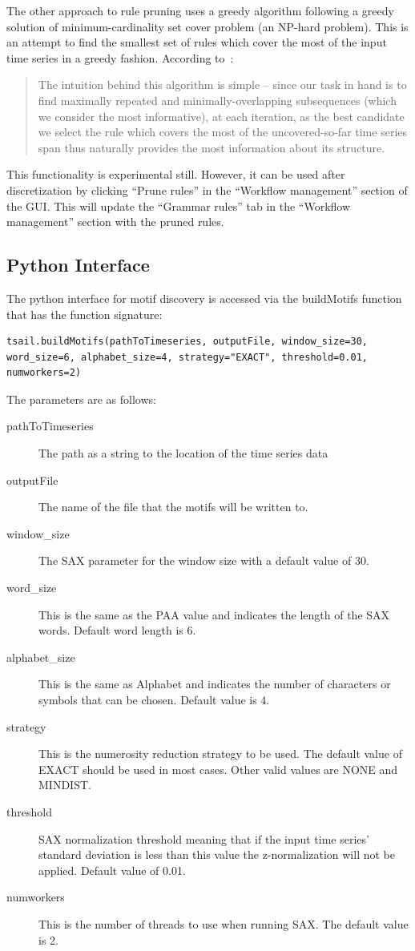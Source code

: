 \documentclass[titlepage, letterpaper, 12pt]{article}
\begin{document}
The other approach to rule pruning uses a greedy algorithm following a greedy solution of minimum-cardinality set cover problem (an NP-hard problem).  This is an attempt to find the smallest set of rules which cover the most of the input time series in a greedy fashion.  According to~\cite{pruneSite}:
\begin{quote}
	The intuition behind this algorithm is simple -- since our task in hand is to find maximally repeated and minimally-overlapping subsequences (which we consider the most informative), at each iteration, as the best candidate we select the rule which covers the most of the uncovered-so-far time series span thus naturally provides the most information about its structure.
\end{quote}

This functionality is experimental still.  However, it can be used after discretization by clicking ``Prune rules'' in the ``Workflow management'' section of the GUI.  This will update the ``Grammar rules'' tab in the ``Workflow management'' section with the pruned rules.




\subsection{Python Interface}
\label{pythonMotif}
The python interface for motif discovery is accessed via the buildMotifs function that has the function signature:
\begin{lstlisting}
tsail.buildMotifs(pathToTimeseries, outputFile, window_size=30, word_size=6, alphabet_size=4, strategy="EXACT", threshold=0.01, numworkers=2)
\end{lstlisting}

The parameters are as follows:
\begin{description}
	\item[pathToTimeseries] The path as a string to the location of the time series data
	\item[outputFile] The name of the file that the motifs will be written to.
	\item[window\_size] The SAX parameter for the window size with a default value of 30.
	\item[word\_size] This is the same as the PAA value and indicates the length of the SAX words.  Default word length is 6.
	\item[alphabet\_size] This is the same as Alphabet and indicates the number of characters or symbols that can be chosen.  Default value is 4.
	\item[strategy] This is the numerosity reduction strategy to be used.  The default value of EXACT should be used in most cases.  Other valid values are NONE and MINDIST.
	\item[threshold] SAX normalization threshold meaning that if the input time series' standard deviation is less than this value the z-normalization will not be applied. Default value of 0.01.
	\item[numworkers] This is the number of threads to use when running SAX.  The default value is 2.
\end{description}
\end{document}
